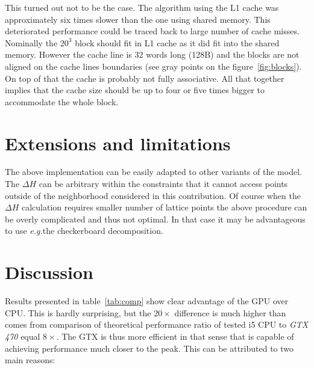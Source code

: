 \documentclass[a4paper]{llncs}
\newcommand{\eg}{\textit{e.g.}}
\begin{document}
This turned out not to be the case. The algorithm using the L1 cache was
approximately six times slower than the one using shared memory. This
deteriorated performance could be traced back to large number of cache misses.
Nominally the $20^3$ block should fit in L1 cache as it did fit into the shared
memory. However the cache line is 32 words long (128B) and the blocks are not
aligned on the cache lines boundaries (see gray points on the
figure~\ref{fig:blocks}). On top of that the cache is probably not fully
associative. All that together implies that the cache size should be up to four
or five times bigger to accommodate the whole block.


\section{Extensions and limitations}

The above implementation can be easily adapted to other variants of the model.
The $\Delta H$ can be arbitrary within the constraints that it cannot access
points outside of the neighborhood considered in this contribution. Of course
when the $\Delta H$ calculation requires smaller number of lattice points the
above procedure can be overly complicated and thus not optimal. In that case it
may be advantageous to use \eg the checkerboard decomposition.


\section{Discussion}

Results presented in table~\ref{tab:comp} show clear advantage of the GPU over
CPU. This is hardly surprising, but the $20\times$ difference is much higher
than comes from comparison of theoretical performance ratio of tested i5 CPU to
\emph{GTX 470} equal $8\times$. The GTX is thus more efficient in that sense
that is capable of achieving performance much closer to the peak. This can be
attributed to two main reasons:
\end{document}
